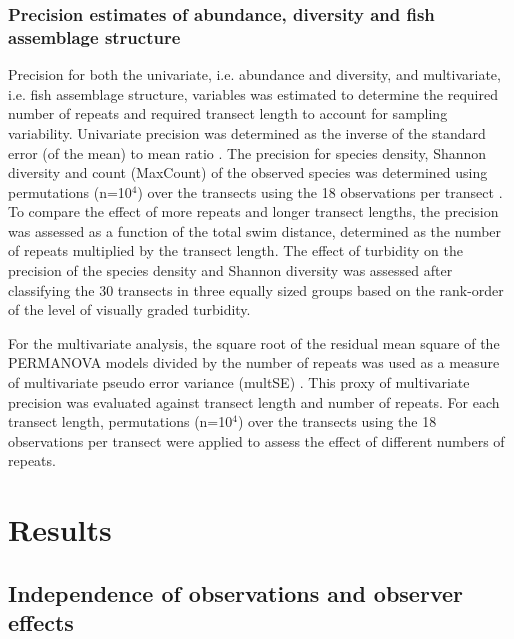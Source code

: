 \documentclass[10pt,letterpaper]{article}
\begin{document}
\subsubsection{Precision estimates of abundance, diversity and fish assemblage structure}
\label{mandm:precision}

Precision for both the univariate, i.e. abundance and diversity, and multivariate, i.e. fish assemblage structure, variables was estimated to determine the required number of repeats and required transect length to account for sampling variability. Univariate precision was determined as the inverse of the standard error (of the mean) to mean ratio \cite{Andrew1987}. The precision for species density, Shannon diversity and count (MaxCount) of the observed species was determined using permutations (n=10$^{4}$) over the transects using the 18 observations per transect \cite{Manly1992}. 
To compare the effect of more repeats and longer transect lengths, the precision was assessed as a function of the total swim distance, determined as the number of repeats multiplied by the transect length. The effect of turbidity on the precision of the species density and Shannon diversity was assessed after classifying the 30 transects in three equally sized groups based on the rank-order of the level of visually graded turbidity. 

For the multivariate analysis, the square root of the residual mean square of the PERMANOVA models divided by the number of repeats was used as a measure of multivariate pseudo error variance (multSE) \cite{Anderson2015}. This proxy of multivariate precision was evaluated against transect length and number of repeats. For each transect length, permutations (n=10$^{4}$) over the transects using the 18 observations per transect were applied to assess the effect of different numbers of repeats.

\section{Results}

\subsection{Independence of observations and observer effects}
\label{Independenceofobservations}
\end{document}

